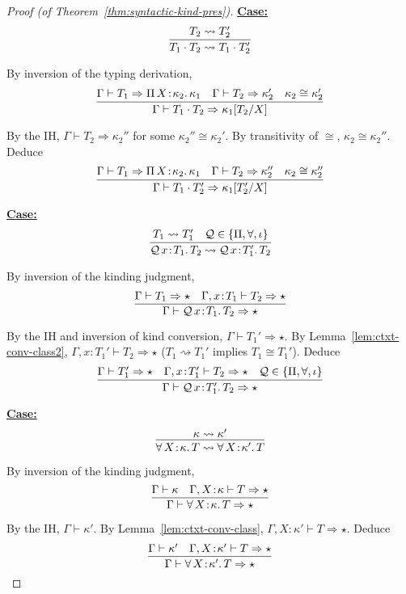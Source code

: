 \documentclass{article}
\newcommand{\abs}[4]{{#1}\, #2\! : \! #3.\, #4}
\newcommand{\tpsynth}[0]{\Rightarrow}
\newcommand{\startcase}[1]{\vspace{#1} \noindent\textbf{\underline{Case:}}}
\begin{document}
\begin{proof}[Proof (of Theorem~\ref{thm:syntactic-kind-pres})]
  \startcase{.2cm}
  \[
    \infer{
      T_1 \cdot T_2 \rightsquigarrow T_1 \cdot T_2'
    }{
      T_2 \rightsquigarrow T_2'
    }
  \]

  By inversion of the typing derivation,
  \[
    \infer{
      \Gamma \vdash T_1 \cdot T_2 \tpsynth \kappa_1[T_2/X]
    }{
      \Gamma \vdash T_1 \tpsynth \abs{\Pi}{X}{\kappa_2}{\kappa_1}
      & \Gamma \vdash T_2 \tpsynth \kappa_2'
      & \kappa_2 \cong \kappa_2'
    }
  \]

  By the IH, \(\Gamma \vdash T_2 \tpsynth \kappa_2''\) for some \(\kappa_2''
  \cong \kappa_2'\).
  By transitivity of \(\cong\), \(\kappa_2 \cong \kappa_2''\).
  Deduce
  \[
    \infer{
      \Gamma \vdash T_1 \cdot T_2' \tpsynth \kappa_1[T_2'/X]
    }{
      \Gamma \vdash T_1 \tpsynth \abs{\Pi}{X}{\kappa_2}{\kappa_1}
      & \Gamma \vdash T_2 \tpsynth \kappa_2''
      & \kappa_2 \cong \kappa_2''
    }
  \]
  
  \startcase{.2cm}
  \[
    \infer{
      \abs{\mathcal{Q}}{x}{T_1}{T_2} \rightsquigarrow \abs{\mathcal{Q}}{x}{T_1'}{T_2}
    }{
      T_1 \rightsquigarrow T_1'
      & \mathcal{Q} \in \{\Pi,\forall,\iota\}
    }
  \]

  By inversion of the kinding judgment,
  \[
    \infer{
      \Gamma \vdash \abs{\mathcal{Q}}{x}{T_1}{T_2} \tpsynth \star
    }{
      \Gamma \vdash T_1 \tpsynth \star
      & \Gamma,x\!:\!T_1 \vdash T_2 \tpsynth \star
    }
  \]

  By the IH and inversion of kind conversion, \(\Gamma \vdash T_1' \tpsynth
  \star\).
  By Lemma~\ref{lem:ctxt-conv-class2}, \(\Gamma,x\!:\!T_1' \vdash T_2 \tpsynth
  \star\) (\(T_1 \rightsquigarrow T_1'\) implies \(T_1 \cong T_1'\)).
  Deduce
  \[
    \infer{
      \Gamma \vdash \abs{\mathcal{Q}}{x}{T_1'}{T_2} \tpsynth \star
    }{
      \Gamma \vdash T_1' \tpsynth \star
      & \Gamma, x\!:\!T_1' \vdash T_2 \tpsynth \star
      & \mathcal{Q} \in \{\Pi,\forall,\iota\}
    }
  \]

  \startcase{.2cm}
  \[
    \infer{
      \abs{\forall}{X}{\kappa}{T} \rightsquigarrow \abs{\forall}{X}{\kappa'}{T}
    }{
      \kappa \rightsquigarrow \kappa'
    }
  \]

  By inversion of the kinding judgment,
  \[
    \infer{
      \Gamma \vdash \abs{\forall}{X}{\kappa}{T} \tpsynth \star
    }{
      \Gamma \vdash \kappa
      & \Gamma,X\!:\!\kappa \vdash T \tpsynth \star
    }
  \]

  By the IH, \(\Gamma \vdash \kappa'\).
  By Lemma~\ref{lem:ctxt-conv-class}, \(\Gamma,X\!:\kappa' \vdash T \tpsynth \star\).
  Deduce
  \[
    \infer{
      \Gamma \vdash \abs{\forall}{X}{\kappa'}{T} \tpsynth \star
    }{
      \Gamma \vdash \kappa'
      & \Gamma,X\!:\!\kappa' \vdash T \tpsynth \star
    }
  \]


\end{proof}
\end{document}
